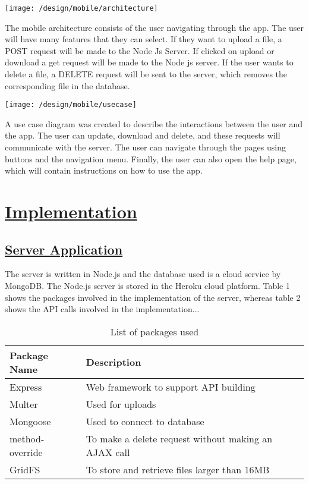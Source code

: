 \documentclass{article}
\begin{document}
\texttt{[image: /design/mobile/architecture]}

The mobile architecture consists of the user navigating through the app. The user will have many features that they can select. If they want to upload a file, a POST request will be made to the Node Js Server. If clicked on upload or download a get request will be made to the Node js server. If the user wants to delete a file, a DELETE request will be sent to the server, which removes the corresponding file in the database.

\texttt{[image: /design/mobile/usecase]}

A use case diagram was created to describe the interactions between the user and the app. The user can update, download and delete, and these requests will communicate with the server. The user can navigate through the pages using buttons and the navigation menu. Finally, the user can also open the help page, which will contain instructions on how to use the app.

\section{\underline{Implementation}}
\subsection{\underline{Server Application}}
The server is written in Node.js and the database used is a cloud service by MongoDB. The Node.js server is stored in the Heroku cloud platform. Table 1 shows the packages involved in the implementation of the server, whereas table 2 shows the API calls involved in the implementation...
\begin{table}[h!]
\begin {center}
\captionsetup{justification=centering}
\caption{List of packages used}
\begin{tabular}{| l | l |}
\hline
\textbf{Package Name} & \textbf{Description}\\
\hline
Express & Web framework to support API building\\
\hline
Multer & Used for uploads\\
\hline
Mongoose & Used to connect to database\\
\hline
method-override & To make a delete request without making an AJAX call\\
\hline
GridFS & To store and retrieve files larger than 16MB\\
\hline
\end{tabular}
\end{center}
\end{table}
\end{document}
